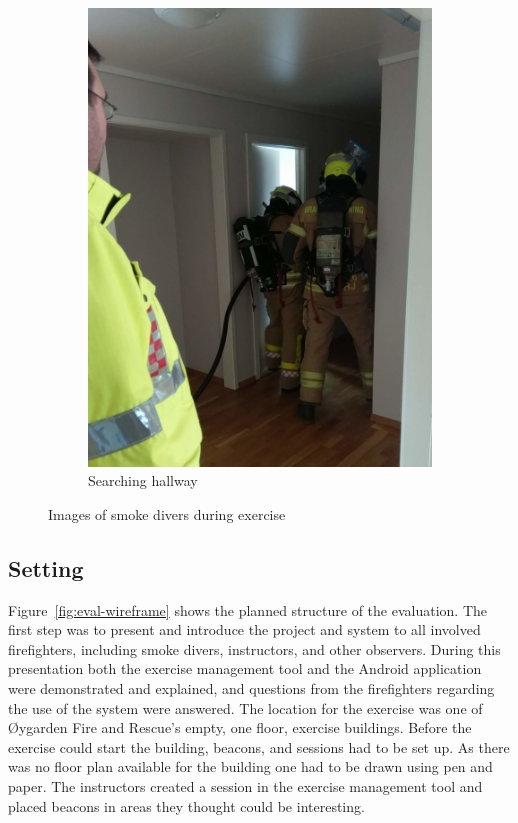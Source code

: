 \documentclass[../Main/thesis.tex]{subfiles}
\begin{document}
\begin{figure}[h]
\begin{subfigure}[t]{0.23\textwidth}
		\includegraphics[width=\textwidth]{../fig/dive4}
		\caption{Searching hallway}
		\label{fig:eval-dive4}
	\end{subfigure}
	\caption{Images of smoke divers during exercise}
	\label{fig:eval-smoke-divers-images}
\end{figure}

\subsection{Setting}
Figure~\ref{fig:eval-wireframe} shows the planned structure of the evaluation.
The first step was to present and introduce the project and system to all involved firefighters, including smoke divers, instructors, and other observers.
During this presentation both the exercise management tool and the Android application were demonstrated and explained, and questions from the firefighters regarding the use of the system were answered.
The location for the exercise was one of Øygarden Fire and Rescue's empty, one floor, exercise buildings.
Before the exercise could start the building, beacons, and sessions had to be set up.
As there was no floor plan available for the building one had to be drawn using pen and paper.
The instructors created a session in the exercise management tool and placed beacons in areas they thought could be interesting.
\end{document}
